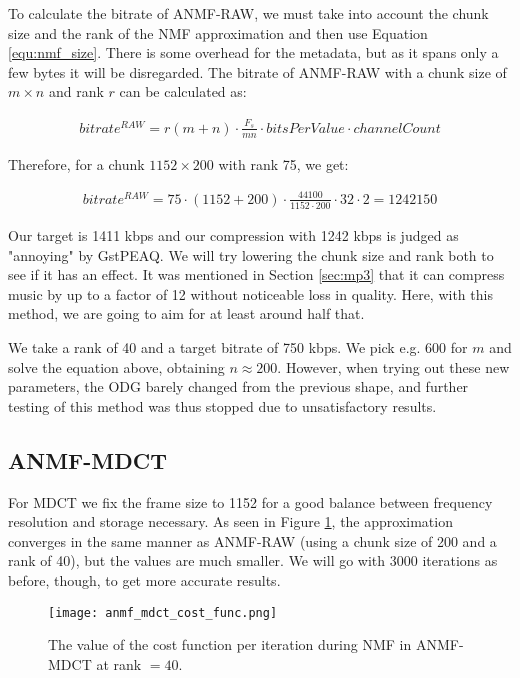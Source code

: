 To calculate the bitrate of ANMF-RAW, we must take into account the chunk size and the rank of the NMF approximation and then use Equation \ref{equ:nmf_size}. There is some overhead for the metadata, but as it spans only a few bytes it will be disregarded. The bitrate of ANMF-RAW with a chunk size of $m \times n$ and rank $r$ can be calculated as:

\begin{align}
bitrate^{RAW} = r(m+n) \cdot \frac{F_s}{mn} \cdot bitsPerValue \cdot channelCount
\end{align}

Therefore, for a chunk $1152 \times 200$ with rank 75, we get:

\begin{align}
bitrate^{RAW} = 75 \cdot (1152 + 200) \cdot \frac{44100}{1152 \cdot 200} \cdot 32 \cdot 2 = 1242150
\end{align}

Our target is 1411 kbps and our compression with 1242 kbps is judged as "annoying" by GstPEAQ. We will try lowering the chunk size and rank both to see if it has an effect. It was mentioned in Section \ref{sec:mp3} that it can compress music by up to a factor of 12 without noticeable loss in quality. Here, with this method, we are going to aim for at least around half that.

We take a rank of 40 and a target bitrate of 750 kbps. We pick e.g. $600$ for $m$ and solve the equation above, obtaining $n \approx 200$. However, when trying out these new parameters, the ODG barely changed from the previous shape, and further testing of this method was thus stopped due to unsatisfactory results.

\subsection{ANMF-MDCT}
For MDCT we fix the frame size to 1152 for a good balance between frequency resolution and storage necessary. As seen in Figure \ref{fig:anmf_mdct_cost_func}, the approximation converges in the same manner as ANMF-RAW (using a chunk size of 200 and a rank of 40), but the values are much smaller. We will go with 3000 iterations as before, though, to get more accurate results.

\begin{figure}[ht]
	\caption[ANMF-MDCT cost function]{The value of the cost function per iteration during NMF in ANMF-MDCT at rank $= 40$.}
	\label{fig:anmf_mdct_cost_func}
	\centering
	\texttt{[image: anmf\_mdct\_cost\_func.png]}
\end{figure}

